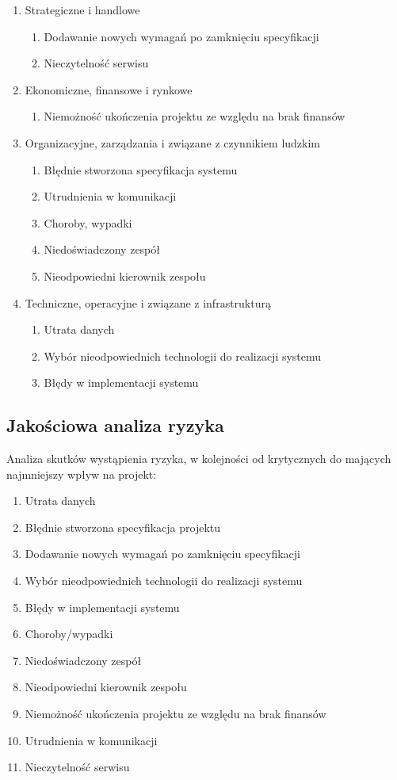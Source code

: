 \documentclass{article}
\begin{document}
\begin{enumerate}
\item{Strategiczne i handlowe}
	\begin{enumerate}
		\item{Dodawanie nowych wymagań po zamknięciu specyfikacji}
		\item{Nieczytelność serwisu}
	\end{enumerate}
\item{Ekonomiczne, finansowe i rynkowe}
	\begin{enumerate}
		\item{Niemożność ukończenia projektu ze względu na brak finansów}
	\end{enumerate}
\item{Organizacyjne, zarządzania i związane z czynnikiem ludzkim}
	\begin{enumerate}
		\item{Błędnie stworzona specyfikacja systemu}
		\item{Utrudnienia w komunikacji}
		\item{Choroby, wypadki}
		\item{Niedoświadczony zespół}
		\item{Nieodpowiedni kierownik zespołu}
	\end{enumerate}
\item{Techniczne, operacyjne i związane z infrastrukturą}
	\begin{enumerate}
		\item{Utrata danych}
		\item{Wybór nieodpowiednich technologii do realizacji systemu}
		\item{Błędy w implementacji systemu}
	\end{enumerate}
\end{enumerate}

\subsection{Jakościowa analiza ryzyka}
Analiza skutków wystąpienia ryzyka, w kolejności od krytycznych do mających najmniejszy wpływ na projekt:
\begin{enumerate}
\item{Utrata danych}
\item{Błędnie stworzona specyfikacja projektu}
\item{Dodawanie nowych wymagań po zamknięciu specyfikacji}
\item{Wybór nieodpowiednich technologii do realizacji systemu}
\item{Błędy w implementacji systemu}
\item{Choroby/wypadki}
\item{Niedoświadczony zespół}
\item{Nieodpowiedni kierownik zespołu}
\item{Niemożność ukończenia projektu ze względu na brak finansów}
\item{Utrudnienia w komunikacji}
\item{Nieczytelność serwisu}
\end{enumerate}
\end{document}
